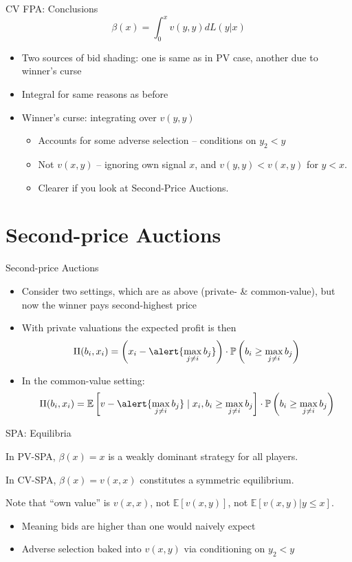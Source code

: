 \documentclass[english,10pt
,aspectratio=169
]{beamer}
\begin{document}
\begin{frame}{CV FPA: Conclusions}
	\[ \beta(x) = \int_0^x v(y,y) dL(y|x) \]
	\begin{itemize}
		\item Two sources of bid shading: one is same as in PV case, another due to winner's curse
		\item Integral for same reasons as before
		\item Winner's curse: integrating over \alert{$v(y,y)$} 
		\begin{itemize}
			\item Accounts for some adverse selection -- conditions on $y_2 < y$
			\item Not $v(x,y)$ -- ignoring own signal $x$, and $v(y,y)<v(x,y)$ for $y<x$.
			\item Clearer if you look at Second-Price Auctions.
		\end{itemize}
	\end{itemize}
\end{frame}


\section{Second-price Auctions}

\begin{frame}{Second-price Auctions}
	\begin{itemize}
		\item Consider two settings, which are as above (private- \& common-value), but now the winner pays \alert{second-highest price}
		\item With private valuations the expected profit is then
		\[ 
			\Pi(b_i,x_i) = \left( x_i - \alert{\max_{j\neq i} b_j} \right) \cdot \mathbb{P} \left( b_i \geq \max_{j\neq i} b_j \right) 
		\]
		\item In the common-value setting:
		\[ 
			\Pi(b_i,x_i) = \mathbb{E} \left[ v - \alert{\max_{j\neq i} b_j} \mid x_i, b_i \geq \max_{j\neq i} b_j \right] \cdot \mathbb{P} \left( b_i \geq \max_{j\neq i} b_j \right) 
		\]
	\end{itemize}
\end{frame}


\begin{frame}{SPA: Equilibria}
	\begin{block}{}
		In PV-SPA, $\beta(x)=x$ is a weakly dominant strategy for all players.
	\end{block}
	\pause
	\begin{block}{}
		In CV-SPA, $\beta(x)=v(x,x)$ constitutes a symmetric equilibrium.
	\end{block}
	Note that ``own value'' is $v(x,x)$, not $\mathbb{E} \left[v(x,y)\right]$, not $\mathbb{E} \left[v(x,y) | y \leq x \right]$. 
	\begin{itemize}
		\item Meaning bids are higher than one would naively expect
		\item Adverse selection baked into $v(x,y)$ via conditioning on $y_2 < y$
	\end{itemize}
\end{frame}
\end{document}
